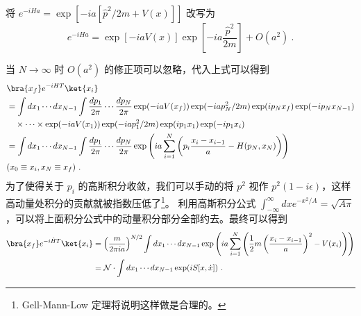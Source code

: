 将 $e^{-iH a}=\exp[-ia[\hat p^2/2m + V(x)]]$ 改写为
\begin{equation}
        e^{-iH a}
        =\exp[-iaV(x)]\exp\left[-ia\frac{\hat p^2}{2m}\right]+O(a^2)~.
\end{equation}

当 $N\rightarrow \infty$ 时 $O(a^2)$ 的修正项可以忽略，代入上式可以得到
\begin{equation}
\begin{aligned}
        &\bra{x_f}e^{-iHT}\ket{x_i}\\
        &=\int d x_1\cdots d x_{N-1}\int \frac{d p_1}{2\pi} \cdots \frac{d p_N}{2\pi}
        \exp(-iaV(x_f))\exp(-iap_N^2/2m) \exp(ip_Nx_f)\exp(-ip_N x_{N-1})
        \\
        &\quad \times \cdots \times 
        \exp(-iaV(x_1))\exp(-iap_1^2/2m) \exp(ip_1x_1)\exp(-ip_1 x_{i})
        \\
        &=\int d x_1\cdots d x_{N-1}\int \frac{d p_1}{2\pi} \cdots \frac{d p_N}{2\pi}
        \exp\left(ia\sum_{i=1}^N\left(p_i\frac{x_i-x_{i-1}}{a}-H(p_N,x_N) \right)\right)\\&(x_0\equiv x_i,x_N\equiv x_f)~.
\end{aligned}
\end{equation}
为了使得关于 $p_i$ 的高斯积分收敛，我们可以手动的将 $p^2$ 视作 $p^2(1-i\epsilon)$，这样高动量处积分的贡献就被指数压低了\footnote{Gell-Mann-Low 定理将说明这样做是合理的。}。
    利用高斯积分公式 $\int_{-\infty}^{\infty} dx e^{-x^2/A}=\sqrt{A\pi}$，可以将上面积分公式中的动量积分部分全部约去。最终可以得到
\begin{equation}
\begin{aligned}
        \bra{x_f}e^{-i\hat HT}\ket{x_i}&=
        \left(\frac{m}{2\pi i a}\right)^{N/2}
        \int d x_1\cdots d x_{N-1} 
        \exp\left( ia\sum_{i=1}^N \left( \frac{1}{2}m \left(\frac{x_i-x_{i-1}}{a}\right)^2 - V(x_i) \right) \right)
        \\
        &=\mathcal{N} \cdot 
        \int d x_1\cdots d x_{N-1} \exp(iS[x,\dot x])~.
\end{aligned}
\end{equation}
